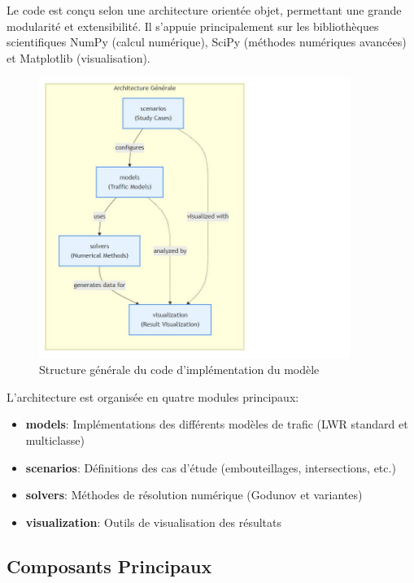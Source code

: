 Le code est conçu selon une architecture orientée objet, permettant une grande modularité et extensibilité. Il s'appuie principalement sur les bibliothèques scientifiques NumPy (calcul numérique), SciPy (méthodes numériques avancées) et Matplotlib (visualisation).

\begin{figure}[htbp]
\centering
\includegraphics[width=0.9\textwidth]{images/mermaid/main}
\caption{Structure générale du code d'implémentation du modèle}
\label{fig:code_structure}
\end{figure}

L'architecture est organisée en quatre modules principaux:
\begin{itemize}
\item \textbf{models}: Implémentations des différents modèles de trafic (LWR standard et multiclasse)
\item \textbf{scenarios}: Définitions des cas d'étude (embouteillages, intersections, etc.)
\item \textbf{solvers}: Méthodes de résolution numérique (Godunov et variantes)
\item \textbf{visualization}: Outils de visualisation des résultats
\end{itemize}

\subsection{Composants Principaux}
\label{subsec:composants}

